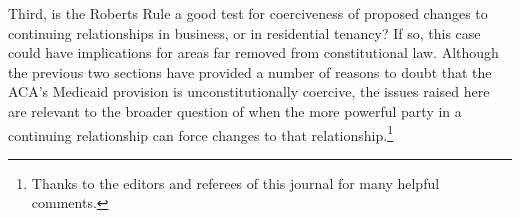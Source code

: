 Third, is the Roberts Rule a good test for coerciveness of proposed changes to continuing relationships in business, or in residential tenancy? If so, this case could have implications for areas far removed from constitutional law. Although the previous two sections have provided a number of reasons to doubt that the ACA's Medicaid provision is unconstitutionally coercive, the issues raised here are relevant to the broader question of when the more powerful party in a continuing relationship can force changes to that relationship.\footnote{Thanks to the editors and referees of this journal for many helpful comments.}
